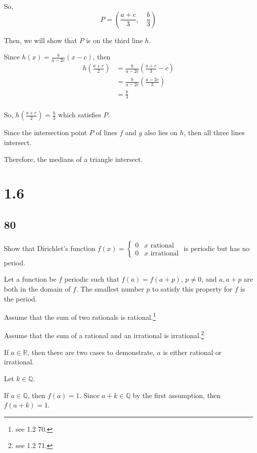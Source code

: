 \documentclass{article}
\begin{document}
So, \[P = \left(\frac{a+c}{3}, \quad \frac{b}{3}\right)\]

Then, we will show that $P$ is on the third line $h$.

Since $h(x) = \frac{b}{a-2c} (x-c)$, then
\begin{align*}
    h\left(\frac{a+c}{2}\right) &= \frac{b}{a-2c} \left(\frac{a+c}{3}-c\right) \\
    &= \frac{b}{a-2c} \left(\frac{a-2c}{3}\right) \\
    &= \frac{b}{3} \\
\end{align*}

So, $h\left( \frac{a+c}{2} \right) = \frac{b}{3}$ which satisfies $P$.

Since the intersection point $P$ of lines $f$ and $g$ also lies on $h$, then all three lines intersect.

Therefore, the medians of a triangle intersect.

\section*{1.6}

\subsection*{80}

Show that Dirichlet's function $ f(x) = \begin{cases} 
    0 & \text{$x$ rational} \\
    0 & \text{$x$ irrational}
\end{cases}$ is periodic but has no period.

Let a function be $f$ periodic such that $f(a) = f(a + p)$, $p \neq 0$, and $a, a+p$ are both in the domain of $f$. 
The smallest number $p$ to satisfy this property for $f$ is the period.

Assume that the sum of two rationals is rational.\footnote{see 1.2 70.}

Assume that the sum of a rational and an irrational is irrational.\footnote{see 1.2 71.}


If $a \in \mathbb{R}$, then there are two cases to demonstrate, $a$ is either rational or irrational.

Let $k \in \mathbb{Q}$.

If $a \in \mathbb{Q}$, then $f(a) = 1$.
Since $a+k \in \mathbb{Q}$ by the first assumption, then $f(a+k) = 1$.
\end{document}
